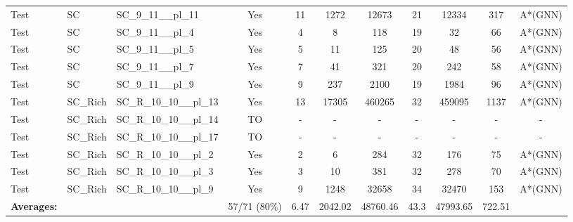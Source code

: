 \documentclass{article}
\begin{document}
\begin{tabular}{lllcccccccc}
Test & SC & SC\_9\_11\_\_pl\_11 & Yes & 11 & 1272 & 12673 & 21 & 12334 & 317 & A*(GNN) \\
Test & SC & SC\_9\_11\_\_pl\_4 & Yes & 4 & 8 & 118 & 19 & 32 & 66 & A*(GNN) \\
Test & SC & SC\_9\_11\_\_pl\_5 & Yes & 5 & 11 & 125 & 20 & 48 & 56 & A*(GNN) \\
Test & SC & SC\_9\_11\_\_pl\_7 & Yes & 7 & 41 & 321 & 20 & 242 & 58 & A*(GNN) \\
Test & SC & SC\_9\_11\_\_pl\_9 & Yes & 9 & 237 & 2100 & 19 & 1984 & 96 & A*(GNN) \\
Test & SC\_Rich & SC\_R\_10\_10\_\_pl\_13 & Yes & 13 & 17305 & 460265 & 32 & 459095 & 1137 & A*(GNN) \\
Test & SC\_Rich & SC\_R\_10\_10\_\_pl\_14 & TO & - & - & - & - & - & - & - \\
Test & SC\_Rich & SC\_R\_10\_10\_\_pl\_17 & TO & - & - & - & - & - & - & - \\
Test & SC\_Rich & SC\_R\_10\_10\_\_pl\_2 & Yes & 2 & 6 & 284 & 32 & 176 & 75 & A*(GNN) \\
Test & SC\_Rich & SC\_R\_10\_10\_\_pl\_3 & Yes & 3 & 10 & 381 & 32 & 278 & 70 & A*(GNN) \\
Test & SC\_Rich & SC\_R\_10\_10\_\_pl\_9 & Yes & 9 & 1248 & 32658 & 34 & 32470 & 153 & A*(GNN) \\
\textbf{Averages:} & & & 57/71 (80\%) & 6.47 & 2042.02 & 48760.46 & 43.3 & 47993.65 & 722.51 & \\
\bottomrule
\end{tabular}
\newpage
\end{document}
